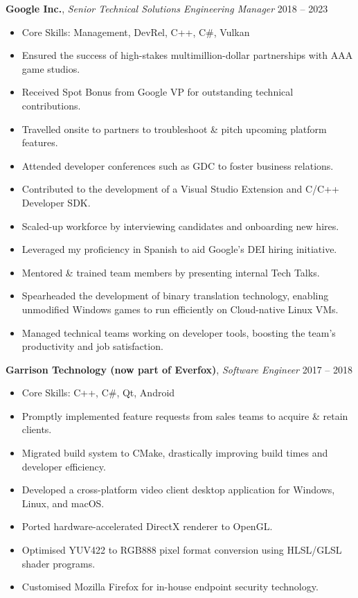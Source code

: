\documentclass[a4paper,10pt]{article}
\newcommand{\coreskills}[1]{\item Core Skills: #1}
\newcommand{\xp}[3]{
  \vspace{1.0em}
  \textbf{#1}, \textit{#2} \hfill #3
  \vspace{0.3em}
}
\begin{document}
{\begin{minipage}[t]{0.72\textwidth}
    \xp{Google Inc.}{Senior Technical Solutions Engineering Manager}{2018 -- 2023}
    \begin{itemize}[leftmargin=1.5em, nosep]
        \coreskills{Management, DevRel, C++, C\#, Vulkan}
        \item Ensured the success of high-stakes multimillion-dollar partnerships with AAA game studios.
        \item Received Spot Bonus from Google VP for outstanding technical contributions.
        \item Travelled onsite to partners to troubleshoot \& pitch upcoming platform features.
        \item Attended developer conferences such as GDC to foster business relations.
        \item Contributed to the development of a Visual Studio Extension and C/C++ Developer SDK.
        \item Scaled-up workforce by interviewing candidates and onboarding new hires.
        \item Leveraged my proficiency in Spanish to aid Google's DEI hiring initiative.
        \item Mentored \& trained team members by presenting internal Tech Talks.
        \item Spearheaded the development of binary translation technology, enabling unmodified Windows games to run efficiently on Cloud-native Linux VMs.
        \item Managed technical teams working on developer tools, boosting the team's productivity and job satisfaction.
    \end{itemize}

    \xp{Garrison Technology (now part of Everfox)}{Software Engineer}{2017 -- 2018}
    \begin{itemize}[leftmargin=1.5em, nosep]
        \coreskills{C++, C\#, Qt, Android}
        \item Promptly implemented feature requests from sales teams to acquire \& retain clients.
        \item Migrated build system to CMake, drastically improving build times and developer efficiency.
        \item Developed a cross-platform video client desktop application for  Windows, Linux, and macOS.
        \item Ported hardware-accelerated DirectX renderer to OpenGL.
        \item Optimised YUV422 to RGB888 pixel format conversion using HLSL/GLSL shader programs.
        \item Customised Mozilla Firefox for in-house endpoint security technology.
    \end{itemize}


\end{minipage}}
\end{document}
